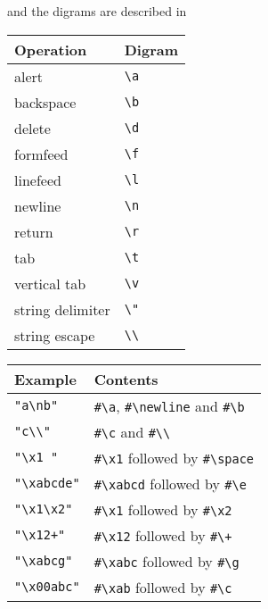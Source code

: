 \begin{optDefinition}
and the digrams are described in
%
\begin{center}
\begin{tabular}{|ll|}\hline
    Operation & Digram \\
    \hline
    alert & \verb+\a+ \\
    backspace & \verb+\b+ \\
    delete & \verb+\d+ \\
    formfeed & \verb+\f+ \\
    linefeed & \verb+\l+ \\
    newline & \verb+\n+ \\
    return & \verb+\r+ \\
    tab & \verb+\t+ \\
    vertical tab & \verb+\v+ \\
    string delimiter & \verb+\"+ \\
    string escape & \verb+\\+ \\
    \hline
\end{tabular}
\end{center}
%
\begin{example}
\label{example:string-literal}
\begin{center}
\begin{tabular}{|ll|}\hline
    Example & Contents\\\hline
    \verb+"a\nb"+ & \verb+#\a+, \verb+#\newline+ and \verb+#\b+\\
    \verb+"c\\"+ & \verb+#\c+ and \verb+#\\+\\
    \verb+"\x1 "+ & \verb+#\x1+ followed by \verb+#\space+\\
    \verb+"\xabcde"+ & \verb+#\xabcd+ followed by \verb+#\e+\\
    \verb+"\x1\x2"+ & \verb+#\x1+ followed by \verb+#\x2+\\
    \verb-"\x12+"- & \verb+#\x12+ followed by \verb-#\+-\\
    \verb+"\xabcg"+ & \verb+#\xabc+ followed by \verb+#\g+\\
    \verb+"\x00abc"+ & \verb+#\xab+ followed by \verb+#\c+\\\hline
\end{tabular}
\end{center}
\end{example}
%
\begin{note}

\end{note}
\end{optDefinition}
